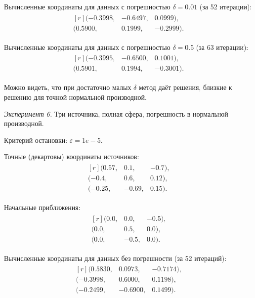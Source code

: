 Вычисленные координаты для данных с погрешностью $\delta=0.01$ (за 52 итерации):
\begin{align*}
    \begin{matrix*}[r]
(-0.3998, & -0.6497, & 0.0999) \text{,}\\
(0.5900, & 0.1999, & -0.2999) \text{.}
    \end{matrix*}
\end{align*}

Вычисленные координаты для данных с погрешностью $\delta=0.5$ (за 63 итерации):
\begin{align*}
    \begin{matrix*}[r]
(-0.3995, & -0.6500, & 0.1001) \text{,}\\
(0.5901, & 0.1994, & -0.3001) \text{.}
    \end{matrix*}
\end{align*}

Можно видеть, что при достаточно малых $\delta$ метод даёт решения, близкие к решению для точной нормальной производной.

\emph{Эксперимент 6.} Три источника, полная сфера, погрешность в нормальной производной.

Критерий остановки: $\varepsilon = 1e-5$.

Точные (декартовы) координаты источников:
\begin{align*}
    \begin{matrix*}[r]
    (0.57, & 0.1, & -0.7) \text{,}\\
    (-0.4, & 0.6, & 0.12) \text{,}\\
    (-0.25, & -0.69, & 0.15) \text{.}
    \end{matrix*}
\end{align*}

Начальные приближения:
\begin{align*}
    \begin{matrix*}[r]
    (0.0, & 0.0, & -0.5) \text{,}\\
    (0.0, & 0.5, & 0.0) \text{,}\\
    (0.0, & -0.5, & 0.0) \text{.}
    \end{matrix*}
\end{align*}

Вычисленные координаты для данных без погрешности (за 52 итераций):
\begin{align*}
    \begin{matrix*}[r]
    (0.5830, & 0.0973, & -0.7174) \text{,}\\
    (-0.3998, & 0.6000, & 0.1198) \text{,}\\
    (-0.2499, & -0.6900, & 0.1499) \text{.}
    \end{matrix*}
\end{align*}

